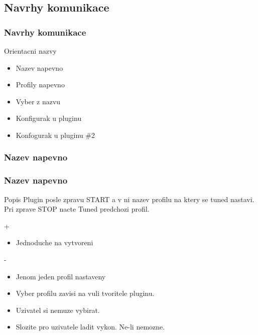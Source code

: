 \documentclass[pdf]{beamer}
\begin{document}

\subsection{Navrhy komunikace}
\begin{frame} %
	\frametitle{Navrhy komunikace}
		Orientacni nazvy
	\begin{itemize}
		\item Nazev napevno
		\item Profily napevno
		\item Vyber z nazvu
		\item Konfigurak u pluginu
		\item Konfogurak u pluginu \#2
	\end{itemize}
\end{frame} %

\subsubsection{Nazev napevno}
\begin{frame} %
	\frametitle{Nazev napevno}
	\begin{block}{Popis}
		Plugin posle zpravu START a v ni nazev profilu na ktery se tuned nastavi.
		Pri zprave STOP nacte Tuned predchozi profil.
	\end{block}
	\begin{block}{+}
		\begin{itemize}
			\item Jednoduche na vytvoreni
		\end{itemize}
	\end{block}
	\begin{block}{-}
		\begin{itemize}
			\item Jenom jeden profil nastaveny
			\item Vyber profilu zavisi na vuli tvoritele pluginu.
			\item Uzivatel si nemuze vybirat.
			\item Slozite pro uzivatele ladit vykon. Ne-li nemozne.
		\end{itemize}
	\end{block}
\end{frame} %
\end{document}
